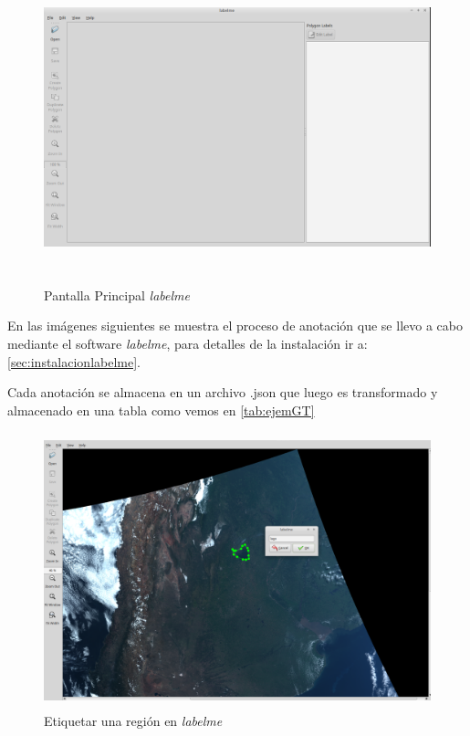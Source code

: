 \begin{figure}[h]
 \centering
  \includegraphics[height=9cm,keepaspectratio=true,clip=true]{imagenes/Logos/labelme.png}
  \caption{Pantalla Principal \textit{labelme}}
	\label{Fig: labelme}
\end{figure}

En las imágenes siguientes se muestra el proceso de anotación que se llevo a cabo mediante el software \textit{labelme}, para detalles de la instalación ir a: \ref{sec:instalacionlabelme}.

Cada anotación se almacena en un archivo .json que luego es transformado y almacenado en una tabla como vemos en \ref{tab:ejemGT}
\begin{figure}[h]
 \centering
  \includegraphics[height=8cm,keepaspectratio=true,clip=true]{imagenes/Logos/labelme1.png}
  \caption{Etiquetar una región en \textit{labelme}}
	\label{Fig: labelme1}
\end{figure}

